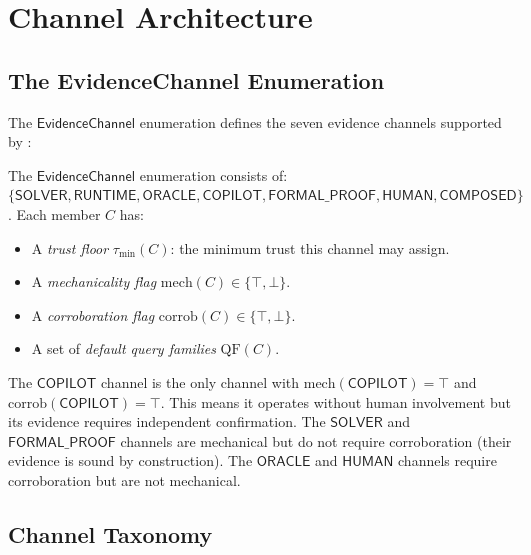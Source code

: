 \documentclass[11pt]{article}
\newcommand{\EvChan}{\mathsf{EvidenceChannel}}
\begin{document}
\section{Channel Architecture}
\label{sec:arch}

\subsection{The EvidenceChannel Enumeration}
\label{sec:arch:enum}

The $\EvChan$ enumeration defines the seven evidence channels
supported by \JuGeo{}:

\begin{definition}
\label{def:ev-channel}
The $\EvChan$ enumeration consists of:
$\{\mathsf{SOLVER}, \mathsf{RUNTIME}, \mathsf{ORACLE},
\mathsf{COPILOT}, \mathsf{FORMAL\_PROOF}, \mathsf{HUMAN},
\mathsf{COMPOSED}\}$.
Each member $C$ has:
\begin{itemize}[leftmargin=2em]
\item A \emph{trust floor} $\tau_{\min}(C)$: the minimum trust
  this channel may assign.
\item A \emph{mechanicality flag} $\mathrm{mech}(C) \in \{\top, \bot\}$.
\item A \emph{corroboration flag} $\mathrm{corrob}(C) \in \{\top, \bot\}$.
\item A set of \emph{default query families} $\mathrm{QF}(C)$.
\end{itemize}
\end{definition}

\begin{remark}
\label{rem:copilot-unique}
The $\mathsf{COPILOT}$ channel is the only channel with
$\mathrm{mech}(\mathsf{COPILOT}) = \top$ and
$\mathrm{corrob}(\mathsf{COPILOT}) = \top$.  This means it
operates without human involvement but its evidence requires
independent confirmation.  The $\mathsf{SOLVER}$ and
$\mathsf{FORMAL\_PROOF}$ channels are mechanical but do not
require corroboration (their evidence is sound by construction).
The $\mathsf{ORACLE}$ and $\mathsf{HUMAN}$ channels require
corroboration but are not mechanical.
\end{remark}

\subsection{Channel Taxonomy}
\label{sec:arch:taxonomy}
\end{document}
